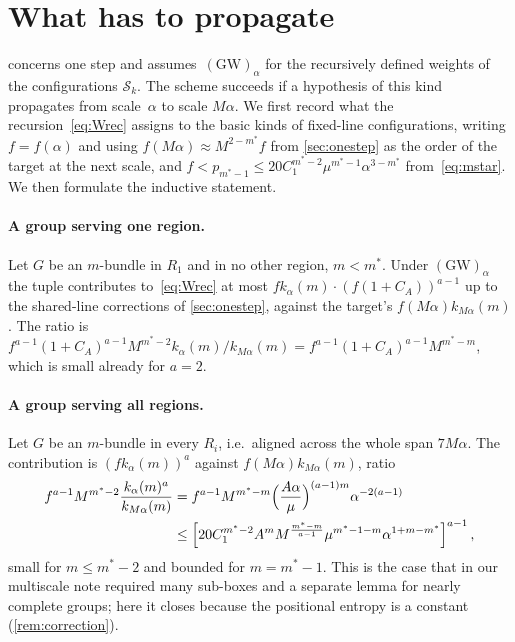 \documentclass[11pt,letterpaper]{article}
\newcommand{\cS}{\mathcal S}
\begin{document}
\section{What has to propagate}
\label{sec:discussion}

 concerns one step and assumes~$\mathrm{(GW)}_\alpha$ for the recursively defined weights of the configurations $\cS_k$. The scheme succeeds if a hypothesis of this kind propagates from scale~$\alpha$ to scale $M\alpha$. We first record what the recursion~\eqref{eq:Wrec} assigns to the basic kinds of fixed-line configurations, writing $f=f(\alpha)$ and using $f(M\alpha)\approx M^{2-m^*}f$ from \cref{sec:onestep} as the order of the target at the next scale, and $f<p_{m^*-1}\le20C_1^{m^*-2}\mu^{m^*-1}\alpha^{3-m^*}$ from~\eqref{eq:mstar}. We then formulate the inductive statement.

\paragraph{A group serving one region.} Let $G$ be an $m$-bundle in $R_1$ and in no other region, $m<m^*$. Under $\mathrm{(GW)}_\alpha$ the tuple contributes to~\eqref{eq:Wrec} at most $fk_\alpha(m)\cdot(f(1+C_A))^{a-1}$ up to the shared-line corrections of \cref{sec:onestep}, against the target's $f(M\alpha)k_{M\alpha}(m)$. The ratio is $f^{a-1}(1+C_A)^{a-1}M^{m^*-2}k_\alpha(m)/k_{M\alpha}(m)=f^{a-1}(1+C_A)^{a-1}M^{m^*-m}$, which is small already for $a=2$.

\paragraph{A group serving all regions.} Let $G$ be an $m$-bundle in every $R_i$, i.e.\ aligned across the whole span $7M\alpha$. The contribution is $(fk_\alpha(m))^a$ against $f(M\alpha)k_{M\alpha}(m)$, ratio
\begin{align*}
  f^{a-1}M^{m^*-2}\frac{k_\alpha(m)^a}{k_{M\alpha}(m)}&=f^{a-1}M^{m^*-m}\Bigl(\frac{A\alpha}{\mu}\Bigr)^{(a-1)m}\alpha^{-2(a-1)}\\
  &\le\Bigl[20C_1^{m^*-2}A^mM^{\frac{m^*-m}{a-1}}\mu^{m^*-1-m}\alpha^{1+m-m^*}\Bigr]^{a-1}\,,
\end{align*}
small for $m\le m^*-2$ and bounded for $m=m^*-1$. This is the case that in our multiscale note required many sub-boxes and a separate lemma for nearly complete groups; here it closes because the positional entropy is a constant (\cref{rem:correction}).
\end{document}
